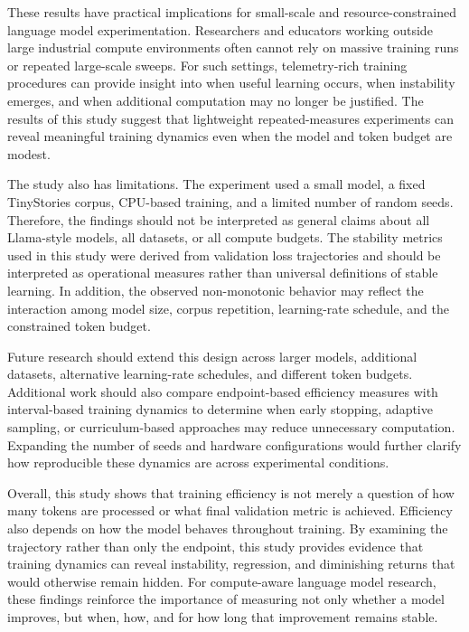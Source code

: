 \documentclass{article}
\begin{document}
These results have practical implications for small-scale and resource-constrained language model experimentation. Researchers and educators working outside large industrial compute environments often cannot rely on massive training runs or repeated large-scale sweeps. For such settings, telemetry-rich training procedures can provide insight into when useful learning occurs, when instability emerges, and when additional computation may no longer be justified. The results of this study suggest that lightweight repeated-measures experiments can reveal meaningful training dynamics even when the model and token budget are modest.

The study also has limitations. The experiment used a small model, a fixed TinyStories corpus, CPU-based training, and a limited number of random seeds. Therefore, the findings should not be interpreted as general claims about all Llama-style models, all datasets, or all compute budgets. The stability metrics used in this study were derived from validation loss trajectories and should be interpreted as operational measures rather than universal definitions of stable learning. In addition, the observed non-monotonic behavior may reflect the interaction among model size, corpus repetition, learning-rate schedule, and the constrained token budget.

Future research should extend this design across larger models, additional datasets, alternative learning-rate schedules, and different token budgets. Additional work should also compare endpoint-based efficiency measures with interval-based training dynamics to determine when early stopping, adaptive sampling, or curriculum-based approaches may reduce unnecessary computation. Expanding the number of seeds and hardware configurations would further clarify how reproducible these dynamics are across experimental conditions.

Overall, this study shows that training efficiency is not merely a question of how many tokens are processed or what final validation metric is achieved. Efficiency also depends on how the model behaves throughout training. By examining the trajectory rather than only the endpoint, this study provides evidence that training dynamics can reveal instability, regression, and diminishing returns that would otherwise remain hidden. For compute-aware language model research, these findings reinforce the importance of measuring not only whether a model improves, but when, how, and for how long that improvement remains stable.



\end{document}
